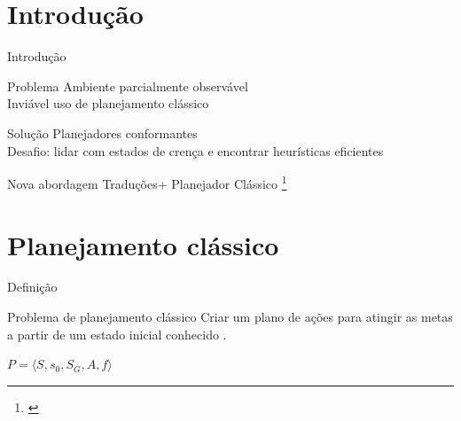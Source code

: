 \begin{frame}
  \titlepage
\end{frame}


\section{Introdução}
\begin{frame}{Introdução}
    
    \begin{block}{Problema}
        Ambiente parcialmente observável\\
        \pause
        Inviável uso de planejamento clássico
    \end{block}
    \pause
    \begin{block}{Solução}
        Planejadores conformantes\\
    \pause
        \alert{Desafio:} lidar com estados de crença e encontrar heurísticas eficientes
    \end{block}
    \pause
    \begin{block}{Nova abordagem}
    \centering
        Traduções+ Planejador Clássico \footnote{\cite{Palacios:2009}}
    \end{block}

\end{frame}


\section{Planejamento clássico}
\begin{frame}{Definição}
    \begin{block}{Problema de planejamento clássico}
        Criar um plano de ações para atingir as metas a partir de um estado 
inicial conhecido \cite{Ghallab:2004}. \\
        \begin{center}
            $P = \langle S, s_0, S_G, A, f \rangle$
        \end{center}
    \end{block}
    
\end{frame}

